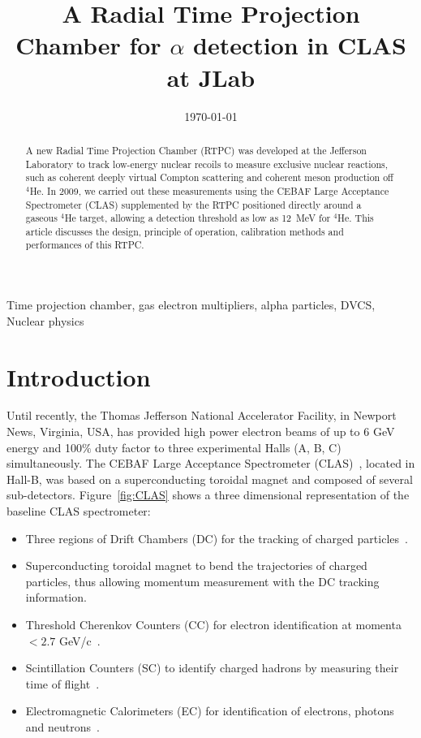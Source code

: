 \documentclass[preprint,5p]{elsarticle}
\begin{document}
\title{\vspace{-15mm}\fontsize{24pt}{10pt}\selectfont\textbf{A Radial Time 
Projection Chamber for $\alpha$ detection in CLAS at JLab}}
  

\date{\today}

\begin{abstract}
A new Radial Time Projection Chamber (RTPC) was developed at the Jefferson 
Laboratory to track low-energy nuclear recoils to measure
exclusive nuclear reactions, such as coherent deeply virtual Compton scattering
and coherent meson production off $^4$He. In
2009, we carried out these measurements using the CEBAF Large
Acceptance Spectrometer (CLAS) supplemented by
the RTPC positioned directly around a gaseous $^4$He target, allowing a detection
threshold as low as 12~MeV for $^4$He. This article discusses the design,
principle of operation, calibration methods and performances of this RTPC.
\end{abstract}

\maketitle

\begin{keywords}
Time projection chamber, gas electron multipliers, alpha particles, DVCS, 
Nuclear physics
\end{keywords}

\section{Introduction} \label{sec:level1}

Until recently, the Thomas Jefferson National Accelerator Facility, in 
Newport News, Virginia, USA, has provided high power electron beams of 
up to 6 GeV energy and 100$\%$ duty factor to three experimental Halls (A, B, C) 
simultaneously. The CEBAF Large
Acceptance Spectrometer (CLAS)~\cite{Mecking:2003zu}, located
in Hall-B, was based on a superconducting toroidal magnet and composed of 
several sub-detectors. Figure~\ref{fig:CLAS} shows a three dimensional 
representation of the baseline CLAS spectrometer:
\begin{itemize}
 \item Three regions of Drift Chambers (DC) for the tracking of charged 
       particles~\cite{Mestayer:2000we}.
 \item Superconducting toroidal magnet to bend the trajectories 
       of charged particles, thus allowing momentum measurement with the DC tracking information.
 \item Threshold Cherenkov Counters (CC) for electron identification at momenta 
    $<2.7$ GeV/c~\cite{Adams:2001kk}.
 \item Scintillation Counters (SC) to identify charged hadrons by measuring their 
       time of flight~\cite{Smith:1999ii}.
 \item Electromagnetic Calorimeters (EC) for identification of electrons, 
       photons and neutrons~\cite{Amarian:2001zs}.
\end{itemize}
\end{document}
